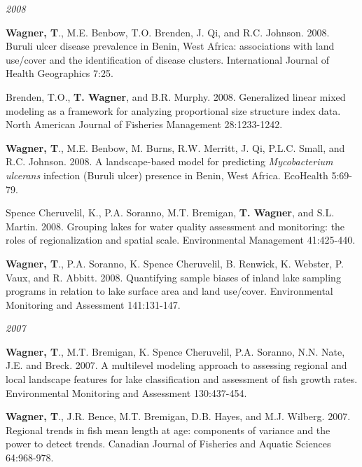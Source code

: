 \documentclass[10pt]{article}
\begin{document}
\begin{flushleft}
\begin{etaremune}[start=15]
\end{etaremune}
\emph{2008}
\begin{etaremune}[start=14]
\item {\bf Wagner, T}., M.E. Benbow, T.O. Brenden, J. Qi, and R.C. Johnson. 2008. Buruli ulcer disease prevalence in Benin, West Africa: associations with land use/cover and the identification of disease clusters. International Journal of Health Geographics 7:25.

\item Brenden, T.O., {\bf T. Wagner}, and B.R. Murphy. 2008. Generalized linear mixed modeling as a framework for analyzing proportional size structure index data. North American Journal of Fisheries Management 28:1233-1242.

\item {\bf Wagner, T}., M.E. Benbow, M. Burns, R.W. Merritt, J. Qi, P.L.C. Small, and R.C. Johnson. 2008. A landscape-based model for predicting \emph{Mycobacterium ulcerans} infection (Buruli ulcer) presence in Benin, West Africa. EcoHealth 5:69-79.

\item Spence Cheruvelil, K., P.A. Soranno, M.T. Bremigan, {\bf T. Wagner}, and S.L. Martin. 2008. Grouping lakes for water quality assessment and monitoring: the roles of regionalization and spatial scale. Environmental Management 41:425-440. 

\item {\bf Wagner, T}., P.A. Soranno, K. Spence Cheruvelil, B. Renwick, K. Webster, P. Vaux, and R. Abbitt. 2008. Quantifying sample biases of inland lake sampling programs in relation to lake surface area and land use/cover. Environmental Monitoring and Assessment 141:131-147.

\end{etaremune}
\emph{2007}
\begin{etaremune}[start=9]
\item {\bf Wagner, T}., M.T. Bremigan, K. Spence Cheruvelil, P.A. Soranno, N.N. Nate, J.E. and Breck. 2007. A multilevel modeling approach to assessing regional and local landscape features for lake classification and assessment of fish growth rates. Environmental Monitoring and Assessment 130:437-454.

\item {\bf Wagner, T}., J.R. Bence, M.T. Bremigan, D.B. Hayes, and M.J. Wilberg. 2007. Regional trends in fish mean length at age: components of variance and the power to detect trends. Canadian Journal of Fisheries and Aquatic Sciences 64:968-978.


\end{etaremune}
\end{flushleft}
\end{document}
